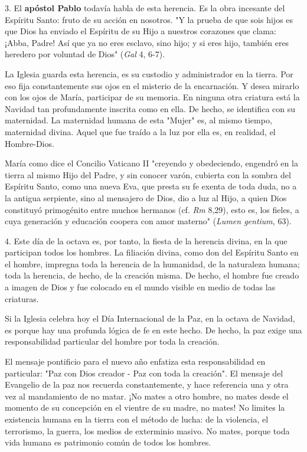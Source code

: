 \begin{body}
3. El \textbf{apóstol Pablo} todavía habla de esta herencia. Es la obra incesante del Espíritu Santo: fruto de su acción en nosotros. "Y la prueba de que sois hijos es que Dios ha enviado el Espíritu de su Hijo a nuestros corazones que clama: ¡Abba, Padre! Así que ya no eres esclavo, sino hijo; y si eres hijo, también eres heredero por voluntad de Dios" (\emph{Gal} 4, 6-7).

La Iglesia guarda esta herencia, es su custodio y administrador en la tierra. Por eso fija constantemente sus ojos en el misterio de la encarnación. Y desea mirarlo con los ojos de María, participar de su memoria. En ninguna otra criatura está la Navidad tan profundamente inscrita como en ella. De hecho, se identifica con su maternidad. La maternidad humana de esta "Mujer" es, al mismo tiempo, maternidad divina. Aquel que fue traído a la luz por ella es, en realidad, el Hombre-Dios.

María como dice el Concilio Vaticano II "creyendo y obedeciendo, engendró en la tierra al mismo Hijo del Padre, y sin conocer varón, cubierta con la sombra del Espíritu Santo, como una nueva Eva, que presta su fe exenta de toda duda, no a la antigua serpiente, sino al mensajero de Dios, dio a luz al Hijo, a quien Dios constituyó primogénito entre muchos hermanos (cf. \emph{Rm} 8,29), esto es, los fieles, a cuya generación y educación coopera con amor materno" (\emph{Lumen gentium}, 63).

4. Este día de la octava es, por tanto, la fiesta de la herencia divina, en la que participan todos los hombres. La filiación divina, como don del Espíritu Santo en el hombre, impregna toda la herencia de la humanidad, de la naturaleza humana; toda la herencia, de hecho, de la creación misma. De hecho, el hombre fue creado a imagen de Dios y fue colocado en el mundo visible en medio de todas las criaturas.

Si la Iglesia celebra hoy el Día Internacional de la Paz, en la octava de Navidad, es porque hay una profunda lógica de fe en este hecho. De hecho, la paz exige una responsabilidad particular del hombre por toda la creación.

El mensaje pontificio para el nuevo año enfatiza esta responsabilidad en particular: "Paz con Dios creador - Paz con toda la creación". El mensaje del Evangelio de la paz nos recuerda constantemente, y hace referencia una y otra vez al mandamiento de no matar. ¡No mates a otro hombre, no mates desde el momento de su concepción en el vientre de su madre, no mates! No limites la existencia humana en la tierra con el método de lucha: de la violencia, el terrorismo, la guerra, los medios de exterminio masivo. No mates, porque toda vida humana es patrimonio común de todos los hombres.


\end{body}
